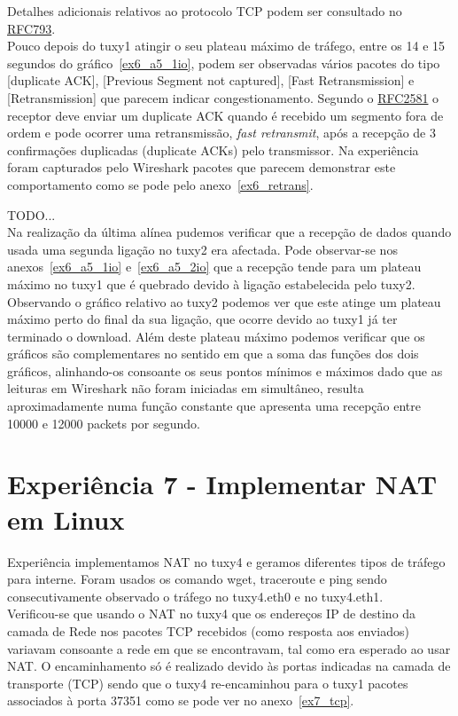 \documentclass[11pt,a4paper,reqno]{report}
\numberwithin{equation}{section}
\begin{document}
Detalhes adicionais relativos ao protocolo TCP podem ser consultado no \href{https://www.ietf.org/rfc/rfc793.txt}{RFC793}.\\

Pouco depois do tuxy1 atingir o seu plateau máximo de tráfego, entre os 14 e 15 segundos do gráfico~\ref{ex6_a5_1io}, podem ser observadas vários pacotes do tipo [duplicate ACK], [Previous Segment not captured], [Fast Retransmission] e [Retransmission] que parecem indicar congestionamento.
Segundo o \href{http://www.ietf.org/rfc/rfc2581.txt}{RFC2581} o receptor deve enviar um duplicate ACK quando é recebido um segmento fora de ordem e pode ocorrer uma retransmissão, \emph{fast retransmit}, após a recepção de 3 confirmações duplicadas (duplicate ACKs) pelo transmissor. Na experiência foram capturados pelo Wireshark pacotes que parecem demonstrar este comportamento como se pode pelo anexo~\ref{ex6_retrans}.

TODO...\\

Na realização da última alínea pudemos verificar que a recepção de dados quando usada uma segunda ligação no tuxy2 era afectada. Pode observar-se nos anexos~\ref{ex6_a5_1io} e~\ref{ex6_a5_2io} que a recepção  tende para um plateau máximo no tuxy1 que é quebrado devido à ligação estabelecida pelo tuxy2. Observando o gráfico relativo ao tuxy2 podemos ver que este atinge um plateau máximo perto do final da sua ligação, que ocorre devido ao tuxy1 já ter terminado o download. Além deste plateau máximo podemos verificar que os gráficos são complementares no sentido em que a soma das funções dos dois gráficos, alinhando-os consoante os seus pontos mínimos e máximos dado que as leituras em Wireshark não foram iniciadas em simultâneo, resulta aproximadamente numa função constante que apresenta uma recepção entre 10000 e 12000 packets por segundo.

\section{Experiência 7 - Implementar NAT em Linux}

Experiência implementamos NAT no tuxy4 e geramos diferentes tipos de tráfego para interne. Foram usados os comando wget, traceroute e ping sendo consecutivamente observado o tráfego no tuxy4.eth0 e no tuxy4.eth1.\\

Verificou-se que usando o NAT no tuxy4 que os endereços IP de destino da camada de Rede nos pacotes TCP recebidos (como resposta aos enviados) variavam consoante a rede em que se encontravam, tal como era esperado ao usar NAT. O encaminhamento só é realizado devido às portas indicadas na camada de transporte (TCP) sendo que o tuxy4 re-encaminhou para o tuxy1 pacotes associados à porta 37351 como se pode ver no anexo~\ref{ex7_tcp}.\\
\end{document}
